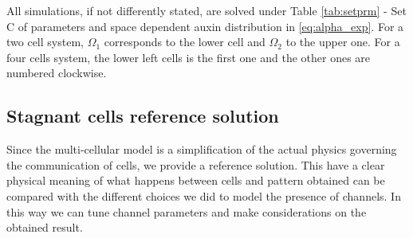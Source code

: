 All simulations, if not differently stated, are solved under Table \ref{tab:setprm} - Set C of parameters and space dependent auxin distribution in \eqref{eq:alpha_exp}. For a two cell system, $\Omega_1$ corresponds to the lower cell and $\Omega_2$ to the upper one. For a four cells system, the lower left cells is the first one and the other ones are numbered clockwise.

\subsection{Stagnant cells reference solution}\label{sec:refRR}
Since the multi-cellular model is a simplification of the actual physics governing the communication of cells, we provide a reference solution. This have a clear physical meaning of what happens between cells and pattern obtained can be compared with the different choices we did to model the presence of channels. In this way we can tune channel parameters and make considerations on the obtained result.

